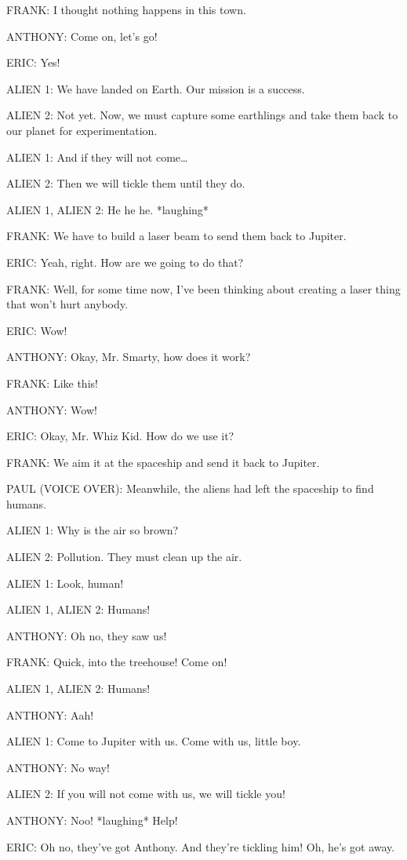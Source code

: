FRANK:
I thought nothing happens in this town.

ANTHONY:
Come on, let's go!

ERIC:
Yes!

ALIEN 1:
We have landed on Earth.
Our mission is a success.

ALIEN 2:
Not yet.
Now, we must capture some earthlings and take them back to our planet for experimentation.

ALIEN 1:
And if they will not come\dots

ALIEN 2:
Then we will tickle them until they do.

ALIEN 1, ALIEN 2:
He he he. *laughing*

FRANK:
We have to build a laser beam to send them back to Jupiter.

ERIC:
Yeah, right.
How are we going to do that?

FRANK:
Well, for some time now, I've been thinking about creating a laser thing that won't hurt anybody.

ERIC:
Wow!

ANTHONY:
Okay, Mr. Smarty, how does it work?

FRANK:
Like this!

ANTHONY:
Wow!

ERIC:
Okay, Mr. Whiz Kid.
How do we use it?

FRANK:
We aim it at the spaceship and send it back to Jupiter.

PAUL (VOICE OVER):
Meanwhile, the aliens had left the spaceship to find humans.

ALIEN 1:
Why is the air so brown?

ALIEN 2:
Pollution.
They must clean up the air.

ALIEN 1:
Look, human!

ALIEN 1, ALIEN 2:
Humans!

ANTHONY:
Oh no, they saw us!

FRANK:
Quick, into the treehouse!
Come on!

ALIEN 1, ALIEN 2:
Humans!

ANTHONY:
Aah!

ALIEN 1:
Come to Jupiter with us.
Come with us, little boy.

ANTHONY:
No way!

ALIEN 2:
If you will not come with us, we will tickle you!

ANTHONY:
Noo!
*laughing*
Help!

ERIC:
Oh no, they've got Anthony.
And they're tickling him!
Oh, he's got away.

